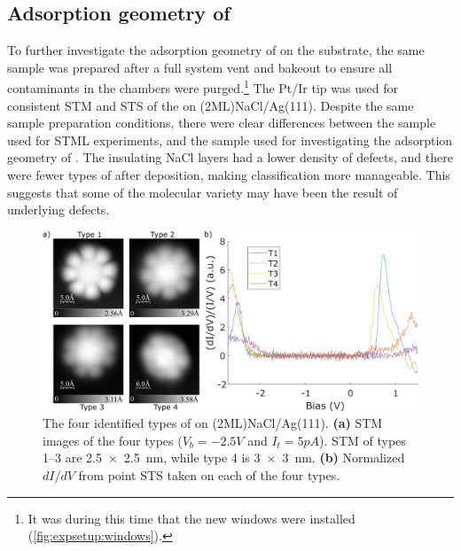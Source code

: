 \subsection{Adsorption geometry of }
\label{sec:opv:adsorp}

To further investigate the adsorption geometry of  on the substrate, the same sample was prepared after a full system vent and bakeout to ensure all contaminants in the chambers were purged.\footnote{It was during this time that the new windows were installed (\autoref{fig:expsetup:windows}).} The Pt/Ir tip was used for consistent \ac{STM} and \ac{STS} of the  on (2ML)NaCl/Ag(111). Despite the same sample preparation conditions, there were clear differences between the sample used for \ac{STML} experiments, and the sample used for investigating the adsorption geometry of . The insulating NaCl layers had a lower density of defects, and there were fewer types of  after deposition, making classification more manageable. This suggests that some of the molecular variety may have been the result of underlying defects. 




\begin{figure} [H]
    \centering
        \includegraphics[width=\textwidth]{pictures/4types_images.png}
    \caption{The four identified types of  on (2ML)NaCl/Ag(111). \textbf{(a)} STM images of the four types ($V_b = -2.5V$ and $I_t = 5pA$). STM of types 1--3 are \SI{2.5x2.5}{nm}, while type 4 is \SI{3x3}{nm}. \textbf{(b)} Normalized $dI/dV$ from point STS taken on each of the four types. }
    \label{fig:opv:f8znpc-sts_types}
\end{figure}

